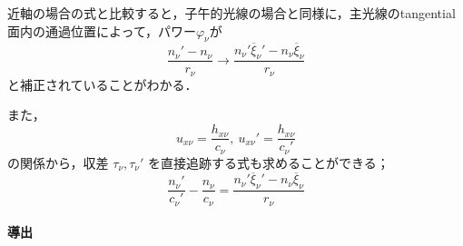 \documentclass{jsarticle}
\begin{document}
近軸の場合の式と比較すると，子午的光線の場合と同様に，主光線のtangential面内の通過位置によって，パワー$\varphi_\nu$が
\begin{equation}
    \frac{n_\nu'-n_\nu}{r_\nu}
    \longrightarrow
    \frac{n_\nu'\overline{\xi}_\nu'-n_\nu\overline{\xi}_\nu}{r_\nu}
\end{equation}
と補正されていることがわかる．

また，
\begin{equation}
    u_{x\nu}=\frac{h_{x\nu}}{c_\nu},\ u_{x\nu}'=\frac{h_{x\nu}}{c_\nu'}
\end{equation}
の関係から，収差 $\tau_\nu, \tau_\nu'$ を直接追跡する式も求めることができる；
\begin{equation}
    \frac{n_\nu'}{c_\nu'}-\frac{n_\nu}{c_\nu}=\frac{n_\nu'\overline{\xi}_\nu'-n_\nu\overline{\xi}_\nu}{r_\nu}
\end{equation}

\paragraph{導出}
\end{document}
